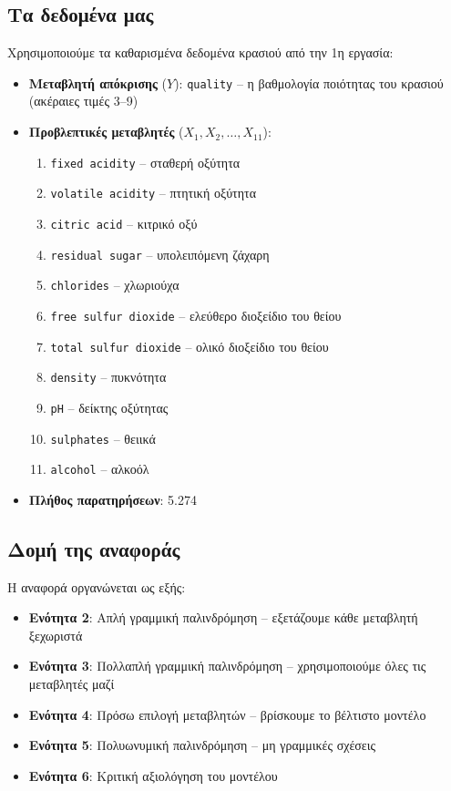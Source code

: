 \documentclass[12pt,a4paper]{article}
\begin{document}
\subsection{Τα δεδομένα μας}

Χρησιμοποιούμε τα καθαρισμένα δεδομένα κρασιού από την 1η εργασία:

\begin{itemize}
    \item \textbf{Μεταβλητή απόκρισης} ($Y$): \texttt{quality} -- η βαθμολογία ποιότητας του κρασιού (ακέραιες τιμές 3--9)
    \item \textbf{Προβλεπτικές μεταβλητές} ($X_1, X_2, \ldots, X_{11}$):
    \begin{enumerate}
        \item \texttt{fixed acidity} -- σταθερή οξύτητα
        \item \texttt{volatile acidity} -- πτητική οξύτητα
        \item \texttt{citric acid} -- κιτρικό οξύ
        \item \texttt{residual sugar} -- υπολειπόμενη ζάχαρη
        \item \texttt{chlorides} -- χλωριούχα
        \item \texttt{free sulfur dioxide} -- ελεύθερο διοξείδιο του θείου
        \item \texttt{total sulfur dioxide} -- ολικό διοξείδιο του θείου
        \item \texttt{density} -- πυκνότητα
        \item \texttt{pH} -- δείκτης οξύτητας
        \item \texttt{sulphates} -- θειικά
        \item \texttt{alcohol} -- αλκοόλ
    \end{enumerate}
    \item \textbf{Πλήθος παρατηρήσεων}: 5.274
\end{itemize}

\subsection{Δομή της αναφοράς}

Η αναφορά οργανώνεται ως εξής:
\begin{itemize}
    \item \textbf{Ενότητα 2}: Απλή γραμμική παλινδρόμηση -- εξετάζουμε κάθε μεταβλητή ξεχωριστά
    \item \textbf{Ενότητα 3}: Πολλαπλή γραμμική παλινδρόμηση -- χρησιμοποιούμε όλες τις μεταβλητές μαζί
    \item \textbf{Ενότητα 4}: Πρόσω επιλογή μεταβλητών -- βρίσκουμε το βέλτιστο μοντέλο
    \item \textbf{Ενότητα 5}: Πολυωνυμική παλινδρόμηση -- μη γραμμικές σχέσεις
    \item \textbf{Ενότητα 6}: Κριτική αξιολόγηση του μοντέλου
\end{itemize}
\end{document}
